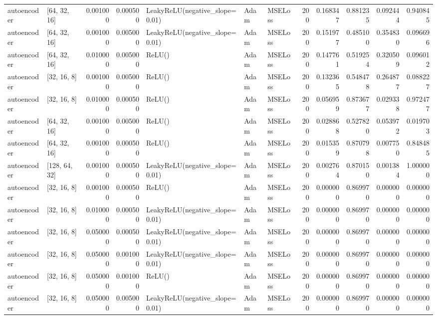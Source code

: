 \documentclass[10pt,twocolumn,letterpaper]{article}
\begin{document}
\begin{appendices}
{\begin{center}
\begin{tabular}{llrrlllrrrrr}
      autoencoder & [64, 32, 16] & 0.001000 & 0.000500 & LeakyReLU(negative\_slope=0.01) & Adam & MSELoss & 200 & 0.168347 & 0.881235 & 0.092444 & 0.940845 \\
      autoencoder & [64, 32, 16] & 0.001000 & 0.005000 & LeakyReLU(negative\_slope=0.01) & Adam & MSELoss & 200 & 0.151977 & 0.485100 & 0.354830 & 0.096696 \\
      autoencoder & [64, 32, 16] & 0.010000 & 0.005000 & ReLU() & Adam & MSELoss & 200 & 0.147761 & 0.519254 & 0.320509 & 0.096012 \\
      autoencoder & [32, 16, 8] & 0.001000 & 0.005000 & ReLU() & Adam & MSELoss & 200 & 0.132365 & 0.548478 & 0.264877 & 0.088227 \\
      autoencoder & [32, 16, 8] & 0.010000 & 0.000500 & ReLU() & Adam & MSELoss & 200 & 0.056959 & 0.873677 & 0.029338 & 0.972477 \\
      autoencoder & [64, 32, 16] & 0.001000 & 0.005000 & ReLU() & Adam & MSELoss & 200 & 0.028868 & 0.527820 & 0.053972 & 0.019703 \\
      autoencoder & [64, 32, 16] & 0.001000 & 0.000500 & ReLU() & Adam & MSELoss & 200 & 0.015359 & 0.870798 & 0.007750 & 0.848485 \\
      autoencoder & [128, 64, 32] & 0.001000 & 0.000500 & LeakyReLU(negative\_slope=0.01) & Adam & MSELoss & 200 & 0.002764 & 0.870150 & 0.001384 & 1.000000 \\
      autoencoder & [32, 16, 8] & 0.001000 & 0.000500 & ReLU() & Adam & MSELoss & 200 & 0.000000 & 0.869970 & 0.000000 & 0.000000 \\
      autoencoder & [32, 16, 8] & 0.010000 & 0.000500 & LeakyReLU(negative\_slope=0.01) & Adam & MSELoss & 200 & 0.000000 & 0.869970 & 0.000000 & 0.000000 \\
      autoencoder & [32, 16, 8] & 0.050000 & 0.000500 & LeakyReLU(negative\_slope=0.01) & Adam & MSELoss & 200 & 0.000000 & 0.869970 & 0.000000 & 0.000000 \\
      autoencoder & [32, 16, 8] & 0.050000 & 0.001000 & LeakyReLU(negative\_slope=0.01) & Adam & MSELoss & 200 & 0.000000 & 0.869970 & 0.000000 & 0.000000 \\
      autoencoder & [32, 16, 8] & 0.050000 & 0.001000 & ReLU() & Adam & MSELoss & 200 & 0.000000 & 0.869970 & 0.000000 & 0.000000 \\
      autoencoder & [32, 16, 8] & 0.050000 & 0.005000 & LeakyReLU(negative\_slope=0.01) & Adam & MSELoss & 200 & 0.000000 & 0.869970 & 0.000000 & 0.000000 \\

\end{tabular}
\end{center}}
\end{appendices}
\end{document}
